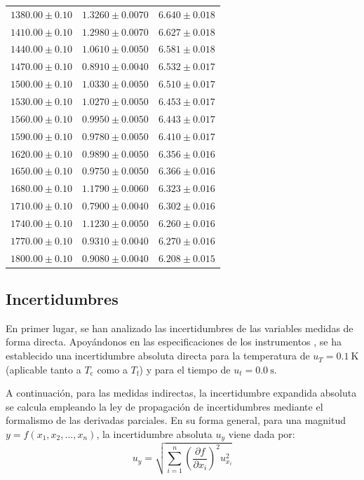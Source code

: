 \documentclass[a4paper,11pt]{article}
\begin{document}
\begin{longtable}{r c c}
$1380.00 \pm 0.10$ & $1.3260 \pm 0.0070$ & $6.640 \pm 0.018$ \\
$1410.00 \pm 0.10$ & $1.2980 \pm 0.0070$ & $6.627 \pm 0.018$ \\
$1440.00 \pm 0.10$ & $1.0610 \pm 0.0050$ & $6.581 \pm 0.018$ \\
$1470.00 \pm 0.10$ & $0.8910 \pm 0.0040$ & $6.532 \pm 0.017$ \\
$1500.00 \pm 0.10$ & $1.0330 \pm 0.0050$ & $6.510 \pm 0.017$ \\
$1530.00 \pm 0.10$ & $1.0270 \pm 0.0050$ & $6.453 \pm 0.017$ \\
$1560.00 \pm 0.10$ & $0.9950 \pm 0.0050$ & $6.443 \pm 0.017$ \\
$1590.00 \pm 0.10$ & $0.9780 \pm 0.0050$ & $6.410 \pm 0.017$ \\
$1620.00 \pm 0.10$ & $0.9890 \pm 0.0050$ & $6.356 \pm 0.016$ \\
$1650.00 \pm 0.10$ & $0.9750 \pm 0.0050$ & $6.366 \pm 0.016$ \\
$1680.00 \pm 0.10$ & $1.1790 \pm 0.0060$ & $6.323 \pm 0.016$ \\
$1710.00 \pm 0.10$ & $0.7900 \pm 0.0040$ & $6.302 \pm 0.016$ \\
$1740.00 \pm 0.10$ & $1.1230 \pm 0.0050$ & $6.260 \pm 0.016$ \\
$1770.00 \pm 0.10$ & $0.9310 \pm 0.0040$ & $6.270 \pm 0.016$ \\
$1800.00 \pm 0.10$ & $0.9080 \pm 0.0040$ & $6.208 \pm 0.015$ \\
\end{longtable}

\subsection{Incertidumbres}
En primer lugar, se han analizado las incertidumbres de las variables medidas de forma directa. Apoyándonos en las especificaciones de los instrumentos , se ha establecido una incertidumbre absoluta directa para la temperatura de $u_T = \SI{0.1}{\kelvin}$ (aplicable tanto a $T_{\mathrm{c}}$ como a $T_{\mathrm{f}}$) y para el tiempo de $u_t = \SI{0.0}{\second}$.

A continuación, para las medidas indirectas, la incertidumbre expandida absoluta se calcula empleando la ley de propagación de incertidumbres mediante el formalismo de las derivadas parciales. En su forma general, para una magnitud $y = f(x_1, x_2, \dots, x_n)$, la incertidumbre absoluta $u_y$ viene dada por:
\begin{equation}
u_y = \sqrt{\sum_{i=1}^{n} \left( \frac{\partial f}{\partial x_i} \right)^2 u_{x_i}^2}
\label{eq:unc_general_base}
\end{equation}
\end{document}
